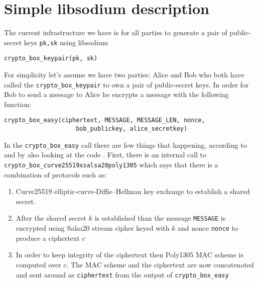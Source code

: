 \section{Simple libsodium description}

The current infrastructure we have is for all parties to generate
a pair of public-secret keys \verb|pk,sk| using libsodium
\begin{verbatim}
crypto_box_keypair(pk, sk)
\end{verbatim}

\noindent For simplicity let's assume we have two parties: Alice and Bob who
both have called the \verb|crypto_box_keypair| to own a pair of public-secret keys.
In order for Bob to send a message to Alice he encrypts a message with the following function:
\begin{verbatim}
crypto_box_easy(ciphertext, MESSAGE, MESSAGE_LEN, nonce,
                    bob_publickey, alice_secretkey)
\end{verbatim}

In the \verb|crypto_box_easy| call there are few things that happening, according to \cite{bernstein2009cryptography}
and by also looking at the code \cite{libsodium}.
First, there is an internal call to  \verb|crypto_box_curve25519xsalsa20poly1305| which
says that there is a combination of protocols such as:
\begin{enumerate}
  \item Curve25519 elliptic-curve-Diffie–Hellman key exchange to establish a shared secret.
  \item After the shared secret $k$ is established than the message \verb|MESSAGE| is encrypted using
  Salsa20 stream cipher keyed with $k$ and nonce \verb|nonce| to produce a ciphertext $c$
  \item In order to keep integrity of the ciphertext then Poly1305 MAC scheme is computed over $c$.
  The MAC scheme and the ciphertext are now concatenated and sent around as \verb|ciphertext| from the output
  of \verb|crypto_box_easy|
\end{enumerate}



